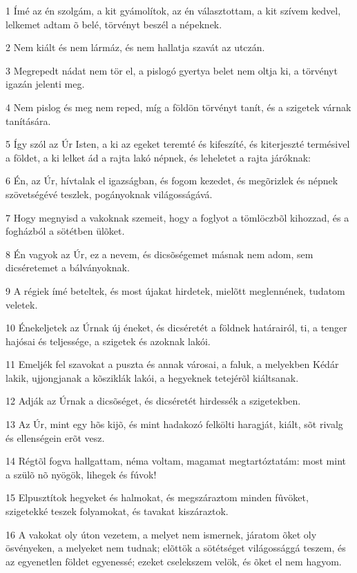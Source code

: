 \par 1 Ímé az én szolgám, a kit gyámolítok, az én választottam, a kit szívem kedvel, lelkemet adtam õ belé, törvényt beszél a népeknek.
\par 2 Nem kiált és nem lármáz, és nem hallatja szavát az utczán.
\par 3 Megrepedt nádat nem tör el, a pislogó gyertya belet nem oltja ki, a törvényt igazán jelenti meg.
\par 4 Nem pislog és meg nem reped, míg a földön törvényt tanít, és a szigetek várnak tanítására.
\par 5 Így szól az Úr Isten, a ki az egeket teremté és kifeszíté, és kiterjeszté termésivel a földet, a ki lelket ád a rajta lakó népnek, és leheletet a rajta járóknak:
\par 6 Én, az Úr, hívtalak el igazságban, és fogom kezedet, és megõrizlek és népnek szövetségévé teszlek, pogányoknak világosságává.
\par 7 Hogy megnyisd a vakoknak szemeit, hogy a foglyot a tömlöczbõl kihozzad, és a fogházból a sötétben ülõket.
\par 8 Én vagyok az Úr, ez a nevem, és dicsõségemet másnak nem adom, sem dicséretemet a bálványoknak.
\par 9 A régiek ímé beteltek, és most újakat hirdetek, mielõtt meglennének, tudatom veletek.
\par 10 Énekeljetek az Úrnak új éneket, és dicséretét a földnek határairól, ti, a tenger hajósai és teljessége, a szigetek és azoknak lakói.
\par 11 Emeljék fel szavokat a puszta és annak városai, a faluk, a melyekben Kédár lakik, ujjongjanak a kõsziklák lakói, a hegyeknek tetejérõl kiáltsanak.
\par 12 Adják az Úrnak a dicsõséget, és dicséretét hirdessék a szigetekben.
\par 13 Az Úr, mint egy hõs kijõ, és mint hadakozó felkölti haragját, kiált, sõt rivalg és ellenségein erõt vesz.
\par 14 Régtõl fogva hallgattam, néma voltam, magamat megtartóztatám: most mint a szülõ nõ nyögök, lihegek és fúvok!
\par 15 Elpusztítok hegyeket és halmokat, és megszáraztom minden fûvöket, szigetekké teszek folyamokat, és tavakat kiszáraztok.
\par 16 A vakokat oly úton vezetem, a melyet nem ismernek, járatom õket oly ösvényeken, a melyeket nem tudnak; elõttök a sötétséget világossággá teszem, és az egyenetlen földet egyenessé; ezeket cselekszem velök, és õket el nem hagyom.
